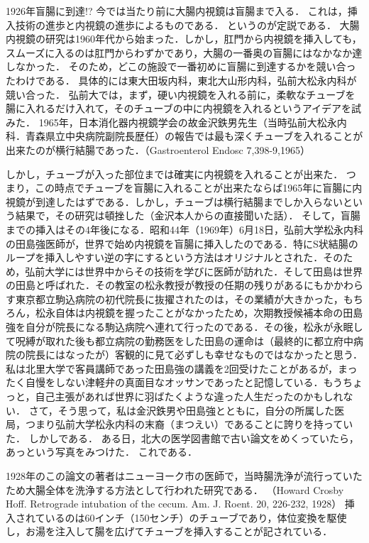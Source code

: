 1926年盲腸に到達!?
今では当たり前に大腸内視鏡は盲腸まで入る．
これは，挿入技術の進歩と内視鏡の進歩によるものである．
というのが定説である．
大腸内視鏡の研究は1960年代から始まった．しかし，肛門から内視鏡を挿入しても，スムーズに入るのは肛門からわずかであり，大腸の一番奥の盲腸にはなかなか達しなかった．
そのため，どこの施設で一番初めに盲腸に到達するかを競い合ったわけである．
具体的には東大田坂内科，東北大山形内科，弘前大松永内科が競い合った．
弘前大では，まず，硬い内視鏡を入れる前に，柔軟なチューブを腸に入れるだけ入れて，そのチューブの中に内視鏡を入れるというアイデアを試みた．
1965年，日本消化器内視鏡学会の故金沢鉄男先生（当時弘前大松永内科．青森県立中央病院副院長歴任）の報告では最も深くチューブを入れることが出来たのが横行結腸であった．（Gastroenterol Endosc 7,398-9,1965）

しかし，チューブが入った部位までは確実に内視鏡を入れることが出来た．
つまり，この時点でチューブを盲腸に入れることが出来たならば1965年に盲腸に内視鏡が到達したはずである．しかし，チューブは横行結腸までしか入らないという結果で，その研究は頓挫した（金沢本人からの直接聞いた話）．
そして，盲腸までの挿入はその4年後になる．昭和44年（1969年）6月18日，弘前大学松永内科の田島強医師が，世界で始め内視鏡を盲腸に挿入したのである．特にS状結腸のループを挿入しやすい逆の字にするという方法はオリジナルとされた．そのため，弘前大学には世界中からその技術を学びに医師が訪れた．そして田島は世界の田島と呼ばれた．その教室の松永教授が教授の任期の残りがあるにもかかわらす東京都立駒込病院の初代院長に抜擢されたのは，その業績が大きかった，もちろん，松永自体は内視鏡を握ったことがなかったため，次期教授候補本命の田島強を自分が院長になる駒込病院へ連れて行ったのである．その後，松永が永眠して呪縛が取れた後も都立病院の勤務医をした田島の運命は（最終的に都立府中病院の院長にはなったが）客観的に見て必ずしも幸せなものではなかったと思う．私は北里大学で客員講師であった田島強の講義を2回受けたことがあるが，まったく自慢をしない津軽弁の真面目なオッサンであったと記憶している．もうちょっと，自己主張があれば世界に羽ばたくような違った人生だったのかもしれない．
さて，そう思って，私は金沢鉄男や田島強とともに，自分の所属した医局，つまり弘前大学松永内科の末裔（まつえい）であることに誇りを持っていた．
しかしである．
ある日，北大の医学図書館で古い論文をめくっていたら，あっという写真をみつけた．
これである．

1928年のこの論文の著者はニューヨーク市の医師で，当時腸洗浄が流行っていたため大腸全体を洗浄する方法として行われた研究である．
（Howard Crosby Hoff. Retrograde intubation of the cecum. Am. J. Roent. 20, 226-232, 1928）
挿入されているのは60インチ（150センチ）のチューブであり，体位変換を駆使し，お湯を注入して腸を広げてチューブを挿入することが記されている．

